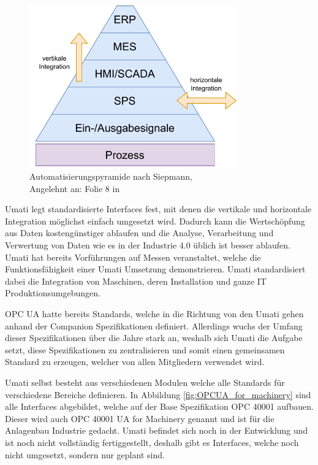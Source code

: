 \documentclass[a4paper, 12pt, oneside]{scrbook}
\begin{document}
		\begin{figure}[H]
			\centering
			\includegraphics[width=0.8\textwidth]{res/diagramms/Automatisierungspyramide.pdf}
			\caption{Automatisierungspyramide nach Siepmann, \\ Angelehnt an: Folie 8 in \cite{mielebacher_verteilte_2021}} 
			\label{fig:Automatisierungspyramide}
		\end{figure}
		
		Umati legt standardisierte Interfaces fest, mit denen die vertikale und horizontale Integration möglichst einfach umgesetzt wird. Dadurch kann die Wertschöpfung aus Daten kostengünstiger ablaufen und die Analyse, Verarbeitung und Verwertung von Daten wie es in der Industrie 4.0 üblich ist besser ablaufen. Umati hat bereits Vorführungen auf Messen veranstaltet, welche die Funktionsfähigkeit einer Umati Umsetzung demonstrieren. Umati standardisiert dabei die Integration von Maschinen, deren Installation und ganze IT Produktionsumgebungen. \cite{noauthor_about_nodate}
	
		
		OPC UA hatte bereits Standards, welche in die Richtung von den Umati gehen anhand der Companion Spezifikationen definiert. Allerdings wuchs der Umfang dieser Spezifikationen über die Jahre stark an, weshalb sich Umati die Aufgabe setzt, diese Spezifikationen zu zentralisieren und somit einen gemeinsamen Standard zu erzeugen, welcher von allen Mitgliedern verwendet wird.
		
		Umati selbst besteht aus verschiedenen Modulen welche alle Standards für verschiedene Bereiche definieren. In Abbildung \ref{fig:OPCUA_for_machinery} sind alle Interfaces abgebildet, welche auf der Base Spezifikation OPC 40001 aufbauen. Dieser wird auch OPC 40001 UA for Machinery genannt und ist für die Anlagenbau Industrie gedacht. Umati befindet sich noch in der Entwicklung und ist noch nicht vollständig fertiggestellt, deshalb gibt es Interfaces, welche noch nicht umgesetzt, sondern nur geplant sind. \cite{noauthor_machinery_nodate}
		
\end{document}
